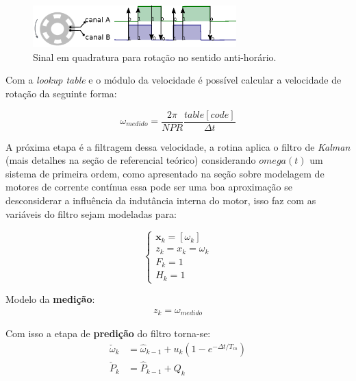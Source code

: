 \begin{figure}[H]
    \centering
    \includegraphics[width=0.7\textwidth]{imagens/ilustracoes/sinal_enquadratura_sentido_CCW.eps}
    \caption{Sinal em quadratura para rotação no sentido anti-horário.}
    \label{fig:ccw_signal}
\end{figure}





Com a \emph{lookup table} e o módulo da velocidade é possível calcular a velocidade de rotação da seguinte forma:

\begin{equation}
    \omega_{medido} = \frac{2\pi}{NPR}\frac{table[code]}{\Delta{t}}
\end{equation}

A próxima etapa é a filtragem dessa velocidade, a rotina aplica o filtro de \emph{Kalman} (mais detalhes na seção de referencial teórico) considerando $omega(t)$ um sistema de primeira ordem, como apresentado na seção sobre modelagem de motores de corrente contínua essa pode ser uma boa aproximação se desconsiderar a influência da indutância interna do motor, isso faz com as variáveis do filtro sejam modeladas para:


\begin{equation*}
\begin{cases}
    \textbf{x}_k = \left[ \omega_k \right]\\
    z_k = x_k = \omega_k\\
    F_k = 1\\
    H_k = 1
\end{cases}
\end{equation*}

Modelo da \textbf{medição}:
\begin{align*}
z_k = \omega_{medido}
\end{align*}

Com isso a etapa de \textbf{predição} do filtro torna-se:
\begin{align*}
    \check{\omega}_k &= \hat{\omega}_{k-1} + u_k\left( 1 - e^{-\Delta{t}/T_m} \right)\\
    \check{P}_k &= \hat{P}_{k-1} + Q_k
\end{align*}

